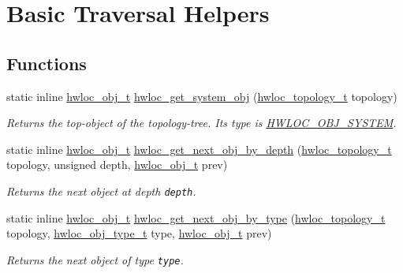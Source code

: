 \hypertarget{group__hwlocality__helper__traversal__basic}{
\section{Basic Traversal Helpers}
\label{group__hwlocality__helper__traversal__basic}
}
\subsection*{Functions}
\begin{CompactItemize}
\item 
static inline \hyperlink{structhwloc__obj}{hwloc\_\-obj\_\-t} \hyperlink{group__hwlocality__helper__traversal__basic_gb39658e42f1046db0f8870a0d0ba9f42}{hwloc\_\-get\_\-system\_\-obj} (\hyperlink{group__hwlocality__topology_g9d1e76ee15a7dee158b786c30b6a6e38}{hwloc\_\-topology\_\-t} topology)
\begin{CompactList}\small\item\em Returns the top-object of the topology-tree. Its type is \hyperlink{group__hwlocality__types_ggcd37bb612667dc437d66bfb175a8dc553aa1b842d1fd4207ebce171f95a244ec}{HWLOC\_\-OBJ\_\-SYSTEM}. \item\end{CompactList}\item 
static inline \hyperlink{structhwloc__obj}{hwloc\_\-obj\_\-t} \hyperlink{group__hwlocality__helper__traversal__basic_g5755cecb9124c5181642ac84dc5bc554}{hwloc\_\-get\_\-next\_\-obj\_\-by\_\-depth} (\hyperlink{group__hwlocality__topology_g9d1e76ee15a7dee158b786c30b6a6e38}{hwloc\_\-topology\_\-t} topology, unsigned depth, \hyperlink{structhwloc__obj}{hwloc\_\-obj\_\-t} prev)
\begin{CompactList}\small\item\em Returns the next object at depth {\tt depth}. \item\end{CompactList}\item 
static inline \hyperlink{structhwloc__obj}{hwloc\_\-obj\_\-t} \hyperlink{group__hwlocality__helper__traversal__basic_gd011fce572551516267de3c57241a326}{hwloc\_\-get\_\-next\_\-obj\_\-by\_\-type} (\hyperlink{group__hwlocality__topology_g9d1e76ee15a7dee158b786c30b6a6e38}{hwloc\_\-topology\_\-t} topology, \hyperlink{group__hwlocality__types_gcd37bb612667dc437d66bfb175a8dc55}{hwloc\_\-obj\_\-type\_\-t} type, \hyperlink{structhwloc__obj}{hwloc\_\-obj\_\-t} prev)
\begin{CompactList}\small\item\em Returns the next object of type {\tt type}. \item\end{CompactList}\item 

\end{CompactItemize}
